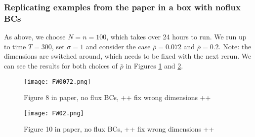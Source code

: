 \subsubsection{Replicating examples from the paper in a box with noflux BCs}
As above, we choose $N = n = 100$, which takes over 24 hours to run. We run up to time $T = 300$, set $\sigma = 1$ and consider the case $\bar \rho = 0.072$ and $ \bar \rho = 0.2$. Note: the dimensions are switched around, which needs to be fixed with the next rerun. We can see the results for both choices of $\bar \rho$ in Figures \ref{F5b} and \ref{F7b}.

\begin{figure}[h]
	\centering
	\texttt{[image: FW0072.png]}
	\caption{Figure 8 in paper, no flux BCs, ++ fix wrong dimensions ++} 
	\label{F5b}
\end{figure}
\begin{figure}[h]
	\centering
	\texttt{[image: FW02.png]}
	\caption{Figure 10 in paper, no flux BCs, ++ fix wrong dimensions ++} 
	\label{F7b}
\end{figure}
